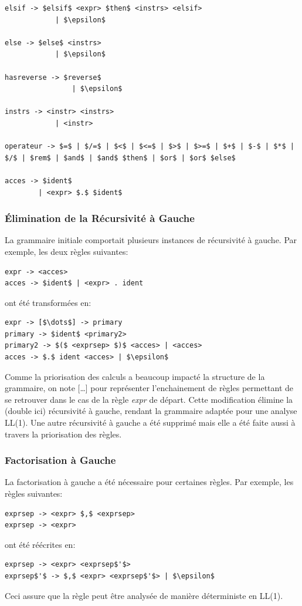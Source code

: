 \documentclass[french,a4paper]{article}
\begin{document}
\begin{lstlisting}[keywordstyle=\color{black},label={lst:lstlisting}]
elsif -> $elsif$ <expr> $then$ <instrs> <elsif>
            | $\epsilon$

else -> $else$ <instrs>
            | $\epsilon$

hasreverse -> $reverse$
                | $\epsilon$

instrs -> <instr> <instrs>
            | <instr>

operateur -> $=$ | $/=$ | $<$ | $<=$ | $>$ | $>=$ | $+$ | $-$ | $*$ | $/$ | $rem$ | $and$ | $and$ $then$ | $or$ | $or$ $else$

acces -> $ident$
        | <expr> $.$ $ident$

    \end{lstlisting}

    \subsubsection{Élimination de la Récursivité à Gauche}
    La grammaire initiale comportait plusieurs instances de récursivité à gauche.
    Par exemple, les deux règles suivantes:
    \begin{lstlisting}[label={lst:lstlisting2}]
expr -> <acces>
acces -> $ident$ | <expr> . ident
    \end{lstlisting}
    ont été transformées en:
    \begin{lstlisting}[label={lst:lstlisting3}]
expr -> [$\dots$] -> primary
primary -> $ident$ <primary2>
primary2 -> $($ <exprsep> $)$ <acces> | <acces>
acces -> $.$ ident <acces> | $\epsilon$
    \end{lstlisting}
    Comme la priorisation des calculs a beaucoup impacté la structure de la grammaire, on note [\dots] pour représenter l'enchainement de règles permettant de se retrouver dans le cas de la règle \textit{expr} de départ.
    Cette modification élimine la (double ici) récursivité à gauche, rendant la grammaire adaptée pour une analyse LL(1).
    Une autre récursivité à gauche a été supprimé mais elle a été faite aussi à travers la priorisation des règles.

    \subsubsection{Factorisation à Gauche}
    La factorisation à gauche a été nécessaire pour certaines règles.
    Par exemple, les règles suivantes:
    \begin{lstlisting}[label={lst:lstlisting4}]
exprsep -> <expr> $,$ <exprsep>
exprsep -> <expr>
    \end{lstlisting}
    ont été réécrites en:
    \begin{lstlisting}[label={lst:lstlisting5}]
exprsep -> <expr> <exprsep$'$>
exprsep$'$ -> $,$ <expr> <exprsep$'$> | $\epsilon$
    \end{lstlisting}
    Ceci assure que la règle peut être analysée de manière déterministe en LL(1).
\end{document}
